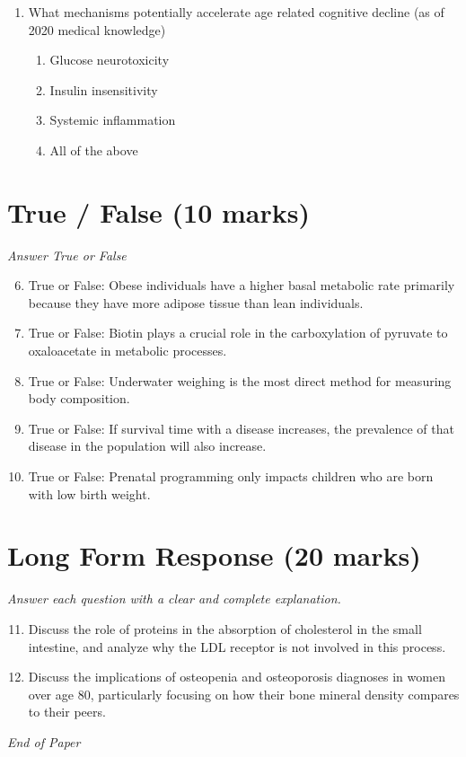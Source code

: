 \documentclass[12pt]{article}
\begin{document}
\begin{enumerate}[label=\arabic*.]
\begin{enumerate}[label=(\alph*)]
    \item Selenocysteine
    \item Selenohistidine
    \item Selenate
\end{enumerate}
\item What mechanisms potentially accelerate age related cognitive decline (as of 2020 medical knowledge)
\begin{enumerate}[label=(\alph*)]
    \item Glucose neurotoxicity
    \item Insulin insensitivity
    \item Systemic inflammation
    \item All of the above
\end{enumerate}
\end{enumerate}

\section*{True / False (10 marks)}
\textit{Answer True or False}
\begin{enumerate}[label=\arabic*.]
\setcounter{enumi}{5}
\item True or False: Obese individuals have a higher basal metabolic rate primarily because they have more adipose tissue than lean individuals.
\item True or False: Biotin plays a crucial role in the carboxylation of pyruvate to oxaloacetate in metabolic processes.
\item True or False: Underwater weighing is the most direct method for measuring body composition.
\item True or False: If survival time with a disease increases, the prevalence of that disease in the population will also increase.
\item True or False: Prenatal programming only impacts children who are born with low birth weight.
\end{enumerate}

\section*{Long Form Response (20 marks)}
\textit{Answer each question with a clear and complete explanation.}
\begin{enumerate}[label=\arabic*.]
\setcounter{enumi}{10}
\item Discuss the role of proteins in the absorption of cholesterol in the small intestine, and analyze why the LDL receptor is not involved in this process.
\item Discuss the implications of osteopenia and osteoporosis diagnoses in women over age 80, particularly focusing on how their bone mineral density compares to their peers.
\end{enumerate}

\vfill
\noindent\textit{End of Paper}
\end{document}
